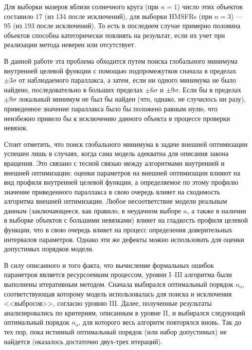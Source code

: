 \documentclass[a4paper, oneside, 14pt]{article}
\begin{document}
Для выборки мазеров вблизи солнечного круга (при $ n = 1 $) число этих объектов составило 17 (из 134 после исключений), для выборки HMSFRs (при $ n = 3 $) --- 95 (из 193 после исключений). То есть в последнем случае примерно половина объектов способна категорически повлиять на результат, если их учет при реализации метода неверен или отсутствует.

В данной работе эта проблема обходится путем поиска глобального минимума внутренней целевой функции с помощью подпромежутков сначала в пределах $ \pm 3 \sigma $ от наблюдаемого параллакса, а затем, если ни одного минимума не было найдено, последовательно в больших пределах $ \pm 6 \sigma $ и $ \pm 9 \sigma $. Если бы в пределах $ \pm 9 \sigma $ локальный минимум не был бы найден (что, однако, не случилось ни разу), приведенное значение параллакса было бы положено равным нулю, что неизбежно привело бы к исключению данного объекта в процессе проверки невязок.

Стоит отметить, что поиск глобального минимума в задаче внешней оптимизации успешен лишь в случаях, когда сама модель адекватна для описания закона вращения. Это связано с тесной связью между алгоритмами внутренней и внешней оптимизации: оценки параметров на внешней оптимизации влияют на вид профиля внутренней целевой функции, а определяемое по этому профилю значение приведенного параллакса в свою очередь влияет на сходимость алгоритма внешней оптимизации. Любое несоответствие модели реальным данным (заключающееся, как правило, в неудачном выборе $ n $, а также в наличии в выборке объектов с большими невязками) влияет на гладкость профиля целевой функции, что в свою очередь влияет на процесс определения доверительных интервалов параметров. Однако эти же дефекты можно использовать для оценки допустимых порядков модели.

В силу описанного и того факта, что вычисление формальных ошибок параметров является ресурсоемким процессом, уровни I--III алгоритма были выполнены итеративным методом. Сначала выбирался оптимальный порядок $ n_\text{o} $, соответствующая которому модель использовалась для поиска и исключения <<выбросов>>, согласно уровню III. Далее, полученные результаты анализировались по критериям, описанным в уровне II, и выбирался следующий оптимальный порядок $ n_\text{o} $, для которого весь алгоритм повторялся вновь. Так до тех пор, пока истинный оптимальный порядок (или набор допустимых) не найдется (оказалось достаточно двух-трех итераций).

\clearpage
\end{document}
